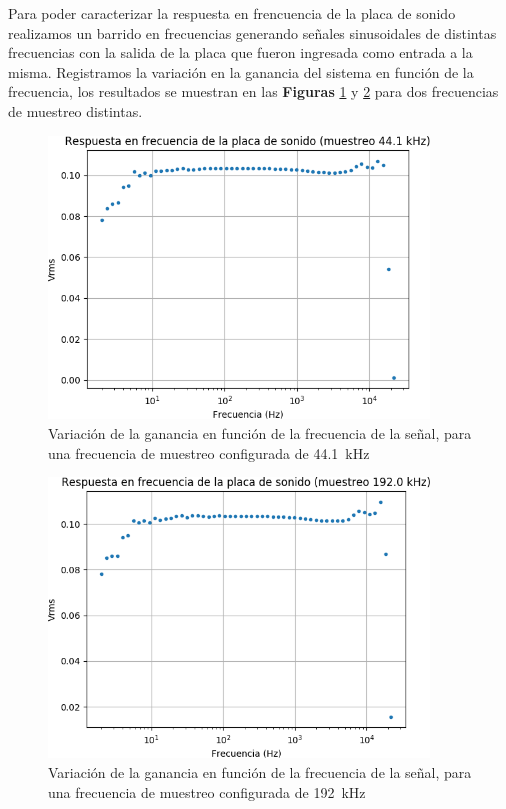 \documentclass[a4paper,11pt]{article}
\begin{document}
Para poder caracterizar la respuesta en frencuencia de la placa de
sonido realizamos un barrido en frecuencias generando señales
sinusoidales de distintas frecuencias con la salida de la placa que
fueron ingresada como entrada a la misma. Registramos la variación en la
ganancia del sistema en función de la frecuencia, los resultados se
muestran en las \textbf{Figuras} \ref{fig:bode44k1} y \ref{fig:bode192k}
para dos frecuencias de muestreo distintas.

	\begin{figure}[!h]
		\centering
		\includegraphics[width=0.9\textwidth]{imagenes/bode44k1Hz.png}
		\caption{Variación de la ganancia en función de la frecuencia de
la señal, para una frecuencia de muestreo configurada de \SI{44.1}{\kHz}}
        \label{fig:bode44k1}
	\end{figure}

	\begin{figure}[!h]
		\centering
		\includegraphics[width=0.9\textwidth]{imagenes/bode192kHz.png}
		\caption{Variación de la ganancia en función de la frecuencia de
la señal, para una frecuencia de muestreo configurada de \SI{192}{\kHz}}
        \label{fig:bode192k}
	\end{figure}
\end{document}
